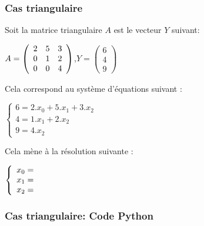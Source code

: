 \begin{frame}[fragile]
\frametitle{Cas triangulaire}

Soit la matrice triangulaire $A$ est le vecteur $Y$ suivant:
\begin{center}
$A=\left(\begin{array}{c c c}
2 & 5 & 3 \\
0 & 1 & 2 \\
0 & 0 & 4
\end{array}\right)$,$Y=\left(\begin{array}{c}
6 \\
4 \\
9
\end{array}\right)$
\end{center}

Cela correspond au système d'équations suivant :
\begin{center}
$\left\{\begin{array}{l}
6=2.x_0+5.x_1+3.x_2 \\
4=1.x_1+2.x_2 \\
9=4.x_2
\end{array}\right.$
\end{center}

Cela mène à la résolution suivante :
\begin{center}
$\left\{\begin{array}{l}
x_0=\ifdef{\public}{\uncover<2->{0.875\\}}{ \\}
x_1=\ifdef{\public}{\uncover<2->{-0.5\\}}{ \\}
x_2=\ifdef{\public}{\uncover<2->{2.25}}{}
\end{array}\right.$
\end{center}

\end{frame}

\begin{frame}[fragile]
\frametitle{Cas triangulaire: Code Python}

\begin{GrayBox}[0.85\textwidth]
\begin{semiverbatim}\small
{}
   \end{semiverbatim}
\end{GrayBox}
\end{frame}

